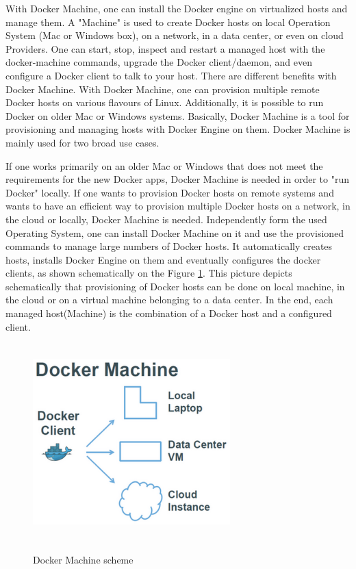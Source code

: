 With Docker Machine, one can install the Docker engine on virtualized
hosts and manage them. A "Machine" is used to create Docker
hosts on local Operation System (Mac or Windows box), on a
network, in a data center, or even on cloud Providers.
One can start, stop, inspect and restart a managed host
with the docker-machine commands, upgrade the Docker client/daemon, and
even configure a Docker client to talk to your host. There are different
benefits with Docker Machine. With Docker Machine, one can provision
multiple remote Docker hosts on various flavours of Linux.
Additionally, it is possible to run Docker on older Mac or Windows systems.
Basically, Docker Machine is a tool for provisioning and
managing hosts with Docker Engine on them\cite{DockerMachine}.
Docker Machine is mainly used for two broad use cases.

If one works primarily on an older Mac or Windows that
does not meet the requirements for the new Docker apps,
Docker Machine is needed in order to "run Docker" locally.
If one wants to provision Docker hosts on remote systems and wants to have
an efficient way to provision multiple Docker hosts on a network,
in the cloud or locally, Docker Machine is needed.
Independently form the used Operating System, one can install
Docker Machine on it and use the provisioned commands to manage
large numbers of Docker hosts\cite{MTBAHeise}.
It automatically creates hosts,
installs Docker Engine on them and eventually
configures the docker clients, as shown schematically on the
Figure \ref{fig:DockerMachinePic}.
This picture depicts schematically that provisioning of Docker hosts can be done
on local machine, in the cloud or on a virtual machine belonging
to a data center. In the end, each managed
host(Machine) is the combination of a Docker host and a configured client.

\begin{figure}
\includegraphics[height=3in, width=3in]{DockerMachine}
\caption{Docker Machine scheme}
\cite{DockerMachinePic}
\label{fig:DockerMachinePic}
\end{figure}

